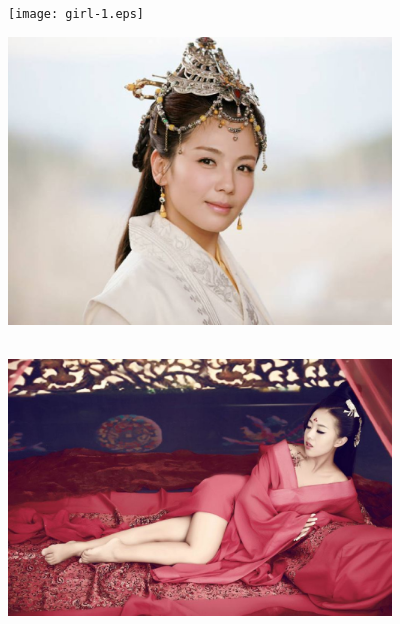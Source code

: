 \documentclass{article}
\begin{document}
\texttt{[image: girl-1.eps]}

\includegraphics[width=4.00in,height=3.00in]{girl-3.eps}

\includegraphics[width=4.00in,height=3.00in]{girl-4.eps}
\end{document}
